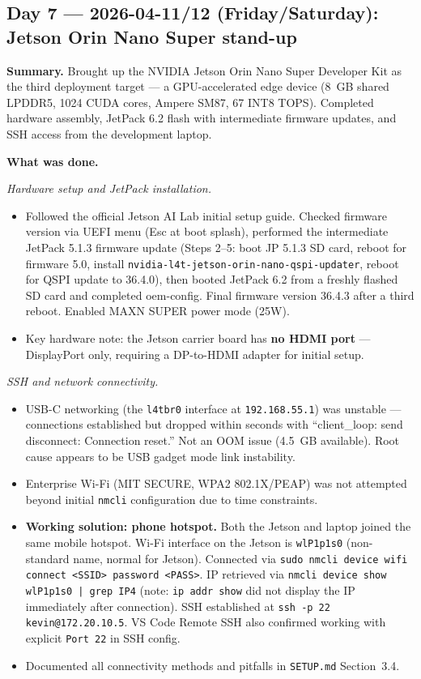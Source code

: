 \documentclass{article}
\theoremstyle{plain}
\theoremstyle{definition}
\theoremstyle{remark}
\begin{document}
\subsection*{Day 7 --- 2026-04-11/12 (Friday/Saturday): Jetson Orin Nano Super stand-up}

\textbf{Summary.} Brought up the NVIDIA Jetson Orin Nano Super Developer Kit as the third deployment target --- a GPU-accelerated edge device (8~GB shared LPDDR5, 1024 CUDA cores, Ampere SM87, 67 INT8 TOPS). Completed hardware assembly, JetPack 6.2 flash with intermediate firmware updates, and SSH access from the development laptop.

\textbf{What was done.}

\textit{Hardware setup and JetPack installation.}
\begin{itemize}
\item Followed the official Jetson AI Lab initial setup guide. Checked firmware version via UEFI menu (Esc at boot splash), performed the intermediate JetPack 5.1.3 firmware update (Steps 2--5: boot JP 5.1.3 SD card, reboot for firmware 5.0, install \texttt{nvidia-l4t-jetson-orin-nano-qspi-updater}, reboot for QSPI update to 36.4.0), then booted JetPack 6.2 from a freshly flashed SD card and completed oem-config. Final firmware version 36.4.3 after a third reboot. Enabled MAXN SUPER power mode (25W).
\item Key hardware note: the Jetson carrier board has \textbf{no HDMI port} --- DisplayPort only, requiring a DP-to-HDMI adapter for initial setup.
\end{itemize}

\textit{SSH and network connectivity.}
\begin{itemize}
\item USB-C networking (the \texttt{l4tbr0} interface at \texttt{192.168.55.1}) was unstable --- connections established but dropped within seconds with ``client\_loop: send disconnect: Connection reset.'' Not an OOM issue (4.5~GB available). Root cause appears to be USB gadget mode link instability.
\item Enterprise Wi-Fi (MIT SECURE, WPA2 802.1X/PEAP) was not attempted beyond initial \texttt{nmcli} configuration due to time constraints.
\item \textbf{Working solution: phone hotspot.} Both the Jetson and laptop joined the same mobile hotspot. Wi-Fi interface on the Jetson is \texttt{wlP1p1s0} (non-standard name, normal for Jetson). Connected via \texttt{sudo nmcli device wifi connect <SSID> password <PASS>}. IP retrieved via \texttt{nmcli device show wlP1p1s0 | grep IP4} (note: \texttt{ip addr show} did not display the IP immediately after connection). SSH established at \texttt{ssh -p 22 kevin@172.20.10.5}. VS Code Remote SSH also confirmed working with explicit \texttt{Port 22} in SSH config.
\item Documented all connectivity methods and pitfalls in \texttt{SETUP.md} Section~3.4.
\end{itemize}
\end{document}
